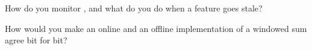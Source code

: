 \begin{interviewq}\label{iq:ml:data-and-feature-stores:5}
How do you monitor , and what do you do when a feature goes stale?
\end{interviewq}

\begin{interviewq}\label{iq:ml:data-and-feature-stores:6}
How would you make an online and an offline implementation of a windowed sum agree bit for bit?
\end{interviewq}
